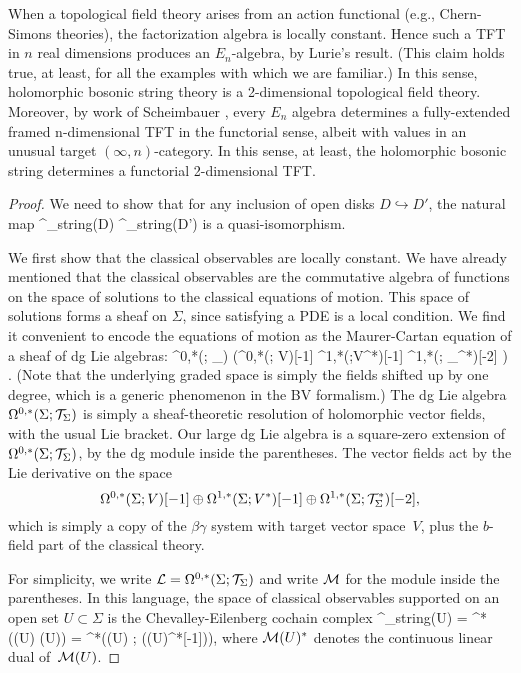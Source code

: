 \begin{rmk}
When a topological field theory arises from an action functional (e.g., Chern-Simons theories),
the factorization algebra is locally constant.
Hence such a TFT in $n$ real dimensions produces an $E_n$-algebra, by Lurie's result. 
(This claim holds true, at least, for all the examples with which we are familiar.)
In this sense, holomorphic bosonic string theory is a 2-dimensional topological field theory. 
Moreover, by work of Scheimbauer \cite{Scheim},
every $E_n$ algebra determines a fully-extended framed n-dimensional TFT in the functorial sense, albeit with values in an unusual target $(\infty,n)$-category.
In this sense, at least, the holomorphic bosonic string determines a functorial 2-dimensional TFT.
\end{rmk}

\begin{proof} 
We need to show that for any inclusion of open disks $D \hookrightarrow D'$, the natural map
\ben
\Obs^\q_{\rm string}(D) \to \Obs^\q_{\rm string}(D')
\een
is a quasi-isomorphism. 

We first show that the classical observables are locally constant. 
We have already mentioned that the classical observables are the commutative algebra of functions on the space of solutions to the classical equations of motion. 
This space of solutions forms a sheaf on $\Sigma$, 
since satisfying a PDE is a local condition.
We find it convenient to encode the equations of motion as the Maurer-Cartan equation of a sheaf  of dg Lie algebras:
\ben
\Omega^{0,*}(\Sigma ; \cT_\Sigma) \ltimes \left(\Omega^{0,*}(\Sigma; V)[-1] \oplus \Omega^{1,*}(\Sigma;V^*)[-1] \oplus \Omega^{1,*}(\Sigma ; \cT_\Sigma^*)[-2] \right) . 
\een
(Note that the underlying graded space is simply the fields shifted up by one degree,
which is a generic phenomenon in the BV formalism.)
The dg Lie algebra $\Omega^{0,*}(\Sigma ; \mathcal T_\Sigma)$ is simply a sheaf-theoretic resolution of holomorphic vector fields, with the usual Lie bracket.
Our large dg Lie algebra is a square-zero extension of $\Omega^{0,*}(\Sigma ; \mathcal T_\Sigma)$, 
by the dg module inside the parentheses.
The vector fields act by the Lie derivative on the space
\[
\Omega^{0,*}(\Sigma; V)[-1] \oplus \Omega^{1,*}(\Sigma;V^*)[-1] \oplus \Omega^{1,*}(\Sigma ; \mathcal T_\Sigma^*)[-2],
\]
which is simply a copy of the $\beta\gamma$ system with target vector space~$V$, plus the $b$-field part of the classical theory.
 
For simplicity, we write $\mathcal L = \Omega^{0,*}(\Sigma ; \mathcal T_\Sigma)$ and write $\mathcal M$ for the module inside the parentheses.
In this language, the space of classical observables supported on an open set $U \subset \Sigma$ is the Chevalley-Eilenberg cochain complex
\ben
\Obs^{\cl}_{\rm string}(U) = \clie^*\left(\cL(U) \ltimes \cM(U)\right) = \clie^*\left(\cL(U) ; \; \Sym(\cM(U)^*[-1])\right),
\een
where $\mathcal M(U)^*$ denotes the continuous linear dual of~$\mathcal M(U)$. 


\end{proof}
